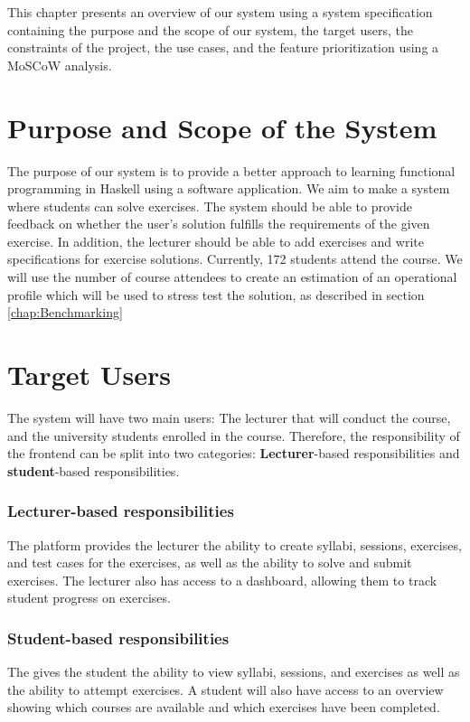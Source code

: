 This chapter presents an overview of our system using a system specification containing the purpose and the scope of our system, the target users, the constraints of the project, the use cases, and the feature prioritization using a MoSCoW analysis.

\section{Purpose and Scope of the System}
The purpose of our system is to provide a better approach to learning functional programming in Haskell using a software application.
We aim to make a system where students can solve exercises. The system should be able to provide feedback on whether the user's solution fulfills the requirements of the given exercise.
In addition, the lecturer should be able to add exercises and write specifications for exercise solutions.
Currently, 172 students attend the course.
We will use the number of course attendees to create an estimation of an operational profile which will be used to stress test the solution, as described in section \ref{chap:Benchmarking}

\section{Target Users} \label{sec:target-users}
The system will have two main users: The lecturer that will conduct the course, and the university students enrolled in the course.
Therefore, the responsibility of the frontend can be split into two categories: \textbf{Lecturer}-based responsibilities and \textbf{student}-based responsibilities.


\subsubsection{Lecturer-based responsibilities}
The platform provides the lecturer the ability to create syllabi, sessions, exercises, and test cases for the exercises, as well as the ability to solve and submit exercises.
The lecturer also has access to a dashboard, allowing them to track student progress on exercises.

\subsubsection{Student-based responsibilities}
The \frontend{} gives the student the ability to view syllabi, sessions, and exercises as well as the ability to attempt exercises. A student will also have access to an overview showing which courses are available and which exercises have been completed.

